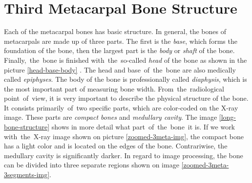 \section{Third Metacarpal Bone Structure}
\label{tmb-structure}
Each of the metacarpal bones has basic structure. In general, the bones of metacarpals are made up of three parts. The first is the \textit{base}, which forms the foundation of the bone, then the largest part is the \textit{body} or \textit{shaft} of the bone. Finally,~the~bone is finished with~the~so-called \textit{head} of the bone as shown in the picture \ref{head-base-body} \cite{metacarpal-structure-radiopedia}. The head and base~of~the~bone are also medically called \textit{epiphyses}. The body of the bone is professionally called \textit{diaphysis}, which is the most important part of measuring bone width. From~the~radiological point~of~view, it is very important to describe the physical structure of the bone. It consists primarily~of~two specific parts, which are color-coded on the X-ray image. These parts are \textit{compact bones} and \textit{medullary cavity}. The image \ref{long-bone-structure} shows in more detail what part~of~the~bone~it is. If we work with~the~X-ray image shown on picture \ref{zoomed-3meta-img}, the compact bone has a light color and is located on the edges of the bone. Contrariwise, the medullary cavity is significantly darker. In regard to image processing, the bone can be divided into three separate regions shown on image \ref{zoomed-3meta-3segments-img}.

